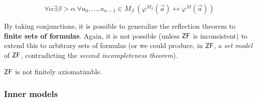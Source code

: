 \begin{corollary}
\begin{equation}
\forall \alpha \exists \beta > \alpha \; \forall a_0, \dots, a_{n-1} \in M_\beta \: (\varphi^{M_\beta}(\vec{a}) \leftrightarrow \varphi^{M}(\vec{a}))
\end{equation}

\end{corollary}By taking conjunctions, it is possible to generalize the reflection theorem to \textbf{finite sets of formulas}. Again, it is not possible (unless $\mathsf{ZF}$ is inconsistent) to extend this to arbitrary sets of formulas (or we could produce, in $\mathsf{ZF}$, a \textit{set model} of $\mathsf{ZF}$, contradicting the \textit{second incompleteness theorem}).

\begin{corollary}\label{cor-zf-axiomatizable}$\mathsf{ZF}$ is not finitely axiomatizable.

\end{corollary}\subsubsection{Inner models}

